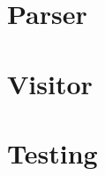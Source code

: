 \documentclass{amsart}
\begin{document}
\section{ Parser }


\section{ Visitor }

\section{ Testing }
\end{document}
